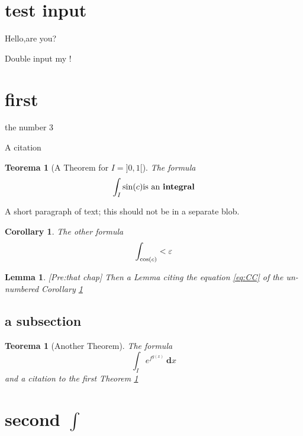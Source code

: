 \documentclass[a4paper,%
twoside]{article}
\def\nr{4}
\def\nr_b{3}
\newcounter{myCount}
\newtheorem{Theorem}%
[myCount]{Teorema}
\newtheorem*{Cor}%
{Corollary}
\newtheorem{Lem}%
{Lemma}
\newcommand\prerequisites[1]{{[Pre:#1]}}
\begin{document}
\section{test input}
%
Hello,are you?

Double input my !

\section{first}%
the number \nr_b

A citation \cite{wiki:it:tautol}

\begin{Theorem}[A  Theorem for {$I=]0,1[$}]
  \label{CT}
  The formula
\[ \int_I {\sin(c)} \hbox{is an \textbf{integral}}\]
\end{Theorem}

A short paragraph of text; this should not be in a separate blob.

\begin{Cor}
  \label{CC}
  The other formula
  \begin{equation}%
    \label{eq:CC}
    \int_{\cos(c)} < \e
  \end{equation}
\end{Cor}
\begin{Lem}\label{lem:2}
  \prerequisites {\emph{that chap}}
  Then a Lemma citing the equation \ref{eq:CC} of the un-numbered Corollary \ref{CC}
\end{Lem}

\subsection{a subsection}

\begin{Theorem}%
  [Another Theorem]
  \label{AT}
  The formula
  \[ \int_I{e^{f^{g(x)}}} \ \textbf{d}x \]
  and a citation to the first Theorem \ref{CT}
\end{Theorem}


\section*{second $\int$}
\end{document}
